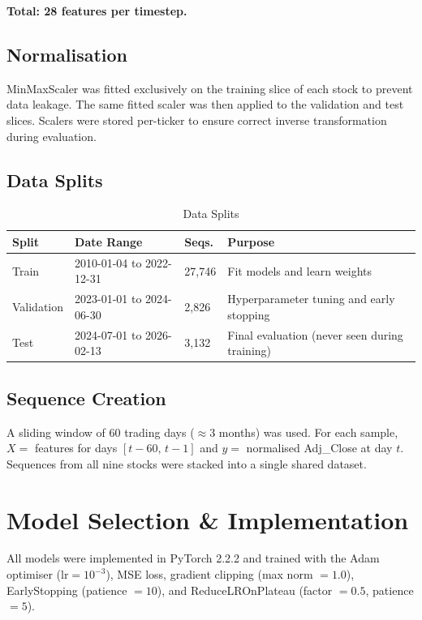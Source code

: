 \documentclass[11pt]{article}
\begin{document}
\noindent\textbf{Total: 28 features per timestep.}

\subsection{Normalisation}

MinMaxScaler was fitted exclusively on the training slice of each stock
to prevent data leakage. The same fitted scaler was then applied to the
validation and test slices. Scalers were stored per-ticker to ensure
correct inverse transformation during evaluation.

\subsection{Data Splits}

\begin{table}[h]
\caption{Data Splits}
\label{tab:splits}
\begin{tabularx}{\linewidth}{L{1.8cm} L{3.4cm} C{2.0cm} X}
\toprule
\textbf{Split} & \textbf{Date Range} & \textbf{Seqs.} & \textbf{Purpose} \\
\midrule
Train      & 2010-01-04 to 2022-12-31 & 27,746 & Fit models and learn weights \\
Validation & 2023-01-01 to 2024-06-30 & 2,826  & Hyperparameter tuning and early stopping \\
Test       & 2024-07-01 to 2026-02-13 & 3,132  & Final evaluation (never seen during training) \\
\bottomrule
\end{tabularx}
\end{table}

\subsection{Sequence Creation}

A sliding window of 60 trading days ($\approx$3 months) was used.
For each sample, $X =$ features for days $[t-60,\,t-1]$ and $y =$
normalised Adj\_Close at day $t$. Sequences from all nine stocks were
stacked into a single shared dataset.

\section{Model Selection \& Implementation}

All models were implemented in PyTorch 2.2.2 and trained with the
Adam optimiser ($\text{lr}=10^{-3}$), MSE loss, gradient clipping
(max norm $= 1.0$), EarlyStopping (patience $= 10$), and
ReduceLROnPlateau (factor $= 0.5$, patience $= 5$).
\end{document}
